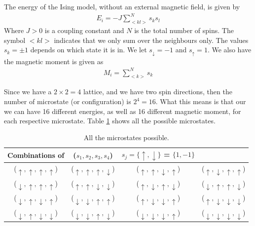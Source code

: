 \documentclass[12pt]{article}
\begin{document}
The energy of the Ising model, without an external magnetic field, is given by
\begin{align*}
E_i = \displaystyle -J \sum_{<kl>}^Ns_k s_l
\end{align*} 
Where $J > 0$ is a coupling constant and $N$ is the total number of spins. The symbol $<kl>$ indicates that we only sum over the neighbours only. The values $s_k = \pm 1$ depends on which state it is in. We let $s_{\downarrow} = -1$ and $s_{\uparrow} = 1$. We also have the magnetic moment is given as
\begin{align*}
M_i = \displaystyle \sum_{<k>}^N s_k
\end{align*}

Since we have a $2\times2=4$ lattice, and we have two spin directions, then the number of microstate (or configuration) is $2^4 = 16$. What this means is that our we can have 16 different energies, as well as 16 different magnetic moment, for each respective microstate. Table \ref{table:All_microstates} shows all the possible microstates.


\begin{table}
\begin{center}
	\begin{tabular}{c c c c}
	Combinations of & ($s_1, s_2, s_3, s_4$)& $s_j = \lbrace \uparrow, \downarrow \rbrace$  = $\lbrace 1, -1 \rbrace$ &\\
	\hline 
	($\uparrow , \uparrow, \uparrow, \uparrow$) & 
	($\uparrow , \uparrow, \uparrow, \downarrow$) & 
	($\uparrow , \uparrow, \downarrow, \uparrow$)  & 
	($\uparrow , \downarrow, \uparrow, \uparrow$) \\
	($\downarrow , \uparrow, \uparrow, \uparrow$)& ($\uparrow, \uparrow, \downarrow, \downarrow$) & ($\uparrow, \downarrow, \uparrow, \downarrow$) & ($\downarrow, \uparrow, \uparrow, \downarrow$) \\
	($\downarrow, \uparrow, \downarrow, \uparrow$)& ($\downarrow, \downarrow, \uparrow, \uparrow$) & ($\uparrow, \downarrow, \downarrow, \uparrow$) & ($\uparrow, \downarrow, \downarrow, \downarrow$) \\
	($\downarrow, \uparrow, \downarrow, \downarrow$) & ($\downarrow, \downarrow, \uparrow, \downarrow$) & ($\downarrow, \downarrow, \downarrow, \uparrow$) & ($\downarrow, \downarrow, \downarrow, \downarrow$) \\
	\hline
	\end{tabular}
\caption{All the microstates possible.}
\label{table:All_microstates}
\end{center}
\end{table}
\end{document}
